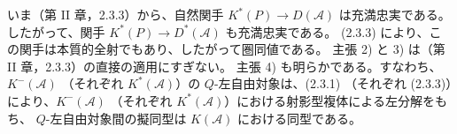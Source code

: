 いま（第 II 章，2.3.3）から、自然関手
$K^{*}(P)\longrightarrow D(\mathcal A)$ は充満忠実である。
したがって、関手 $K^{*}(P)\longrightarrow D^{*}(\mathcal A)$ も充満忠実である。
(2.3.3) により、この関手は本質的全射でもあり、したがって圏同値である。
主張 2) と 3) は（第 II 章，2.3.3）の直接の適用にすぎない。
主張 4) も明らかである。すなわち、$K^{-}(\mathcal A)$
（それぞれ $K^{*}(\mathcal A)$）の $Q$-左自由対象は、(2.3.1)
（それぞれ (2.3.3)）により、$K^{-}(\mathcal A)$
（それぞれ $K^{*}(\mathcal A)$）における射影型複体による左分解をもち、
$Q$-左自由対象間の擬同型は $K(\mathcal A)$ における同型である。
\endgroup
